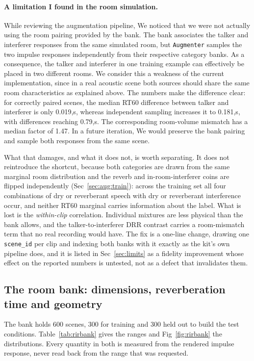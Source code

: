 \documentclass{article}
\begin{document}
\paragraph{A limitation I found in the room simulation.}
While reviewing the augmentation pipeline, We noticed that we were not actually using the room pairing provided by the bank. The bank associates the talker and interferer responses from the same simulated room, but \texttt{Augmenter} samples the two impulse responses independently from their respective category banks. As a consequence, the talker and interferer in one training example can effectively be placed in two different rooms. We consider this a weakness of the current implementation, since in a real acoustic scene both sources should share the same room characteristics as explained above. The numbers make the difference clear: for correctly paired scenes, the median RT60 difference between talker and interferer is only 0.019,s, whereas independent sampling increases it to 0.181,s, with differences reaching 0.79,s. The corresponding room-volume mismatch has a median factor of 1.47. In a future iteration, We would preserve the bank pairing and sample both responses from the same scene.

What that damages, and what it does not, is worth separating. It does not reintroduce the shortcut, because both categories are drawn from the same marginal room distribution and the reverb and in-room-interferer coins are flipped independently (Sec~\ref{sec:aug:train}): across the training set all four combinations of dry or reverberant speech with dry or reverberant interference occur, and neither RT60 marginal carries information about the label. What is lost is the \emph{within-clip} correlation. Individual mixtures are less physical than the bank allows, and the talker-to-interferer DRR contrast carries a room-mismatch term that no real recording would have. The fix is a one-line change, drawing one \texttt{scene\_id} per clip and indexing both banks with it exactly as the kit's own pipeline does, and it is listed in Sec~\ref{sec:limits} as a fidelity improvement whose effect on the reported numbers is untested, not as a defect that invalidates them.

\subsection{The room bank: dimensions, reverberation time and geometry}

The bank holds 600 scenes, 300 for training and 300 held out to build the test conditions. Table~\ref{tab:rirbank} gives the ranges and Fig~\ref{fig:rirbank} the distributions. Every quantity in both is measured from the rendered impulse response, never read back from the range that was requested.
\end{document}
